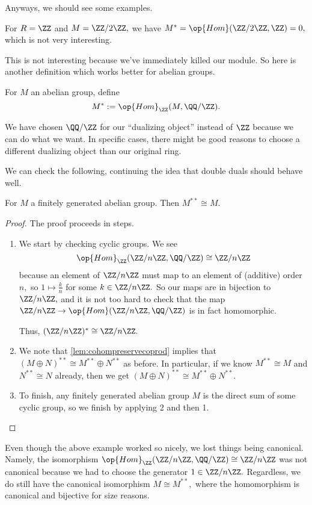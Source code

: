 Anyways, we should see some examples.
\begin{example}
	For $R=\ZZ$ and $M=\ZZ/2\ZZ,$ we have $M^*=\op{Hom}(\ZZ/2\ZZ,\ZZ)=0,$ which is not very interesting.
\end{example}
This is not interesting because we've immediately killed our module. So here is another definition which works better for abelian groups.
\begin{definition}
	For $M$ an abelian group, define
	\[M^*:=\op{Hom}_\ZZ(M,\QQ/\ZZ).\]
\end{definition}
\begin{remark}
	We have chosen $\QQ/\ZZ$ for our ``dualizing object'' instead of $\ZZ$ because we can do what we want. In specific cases, there might be good reasons to choose a different dualizing object than our original ring.
\end{remark}
We can check the following, continuing the idea that double duals should behave well.
\begin{proposition}
	For $M$ a finitely generated abelian group. Then $M^{**}\cong M.$
\end{proposition}
\begin{proof}
	The proof proceeds in steps.
	\begin{enumerate}
		\item We start by checking cyclic groups. We see
		\[\op{Hom}_\ZZ(\ZZ/n\ZZ,\QQ/\ZZ)\cong\ZZ/n\ZZ\]
		because an element of $\ZZ/n\ZZ$ must map to an element of (additive) order $n,$ so $1\mapsto\frac kn$ for some $k\in\ZZ/n\ZZ.$ So our maps are in bijection to $\ZZ/n\ZZ,$ and it is not too hard to check that the map $\ZZ/n\ZZ\to\op{Hom}(\ZZ/n\ZZ,\QQ/\ZZ)$ is in fact homomorphic.

		Thus, $(\ZZ/n\ZZ)^*\cong\ZZ/n\ZZ.$
		\item We note that \autoref{lem:cohompreservecoprod} implies that $(M\oplus N)^{**}\cong M^{**}\oplus N^{**}$ as before. In particular, if we know $M^{**}\cong M$ and $N^{**}\cong N$ already, then we get $(M\oplus N)^{**}\cong M^{**}\oplus N^{**}.$
		\item To finish, any finitely generated abelian group $M$ is the direct sum of some cyclic group, so we finish by applying 2 and then 1.
		\qedhere
	\end{enumerate}
\end{proof}
Even though the above example worked so nicely, we lost things being canonical. Namely, the isomorphism $\op{Hom}_\ZZ(\ZZ/n\ZZ,\QQ/\ZZ)\cong\ZZ/n\ZZ$ was not canonical because we had to choose the generator $1\in\ZZ/n\ZZ.$ Regardless, we do still have the canonical isomorphism $M\cong M^{**},$ where the homomorphism is canonical and bijective for size reasons.

